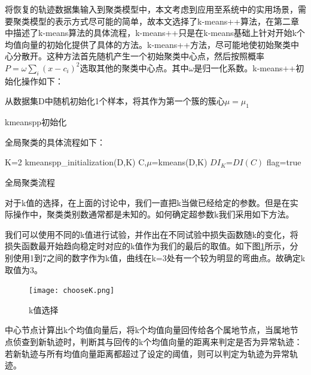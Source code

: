 将恢复的轨迹数据集输入到聚类模型中，本文考虑到应用至系统中的实用场景，需要聚类模型的表示方式尽可能的简单，故本文选择了k-means++算法，在第二章中描述了k-means算法的具体流程，k-means++只是在k-means基础上针对开始k个均值向量的初始化提供了具体的方法。k-means++方法，尽可能地使初始聚类中心分散开。这种方法首先随机产生一个初始聚类中心点，然后按照概率$P=\omega \sum_i{\left( x-c_i \right) ^2}$选取其他的聚类中心点。其中$\omega$是归一化系数。k-means++初始化操作如下：\\
\begin{algorithm}[H]
	 从数据集D中随机初始化1个样本，将其作为第一个簇的簇心$\mu={\mu_1}$\;
	 \caption{kmeanspp初始化}
\end{algorithm}

全局聚类的具体流程如下：

\begin{algorithm}[H]
	 K=2\;
	 kmeanspp\_initialization(D,K)\;
	 C,$\mu$=kmeans(D,K)\;
	 $DI_K$=$DI(C)$\;
	 flag=true\;
	 \caption{全局聚类流程}
	\label{kmeanspp}
\end{algorithm}

对于k值的选择，在上面的讨论中，我们一直把k当做已经给定的参数。但是在实际操作中，聚类类别数通常都是未知的。如何确定超参数k我们采用如下方法。

我们可以使用不同的k值进行试验，并作出在不同试验中损失函数随k的变化，将损失函数最开始趋向稳定时对应的k值作为我们的最后的取值。如下图\ref{chooseK}所示，分别使用1到7之间的数字作为k值，曲线在k=3处有一个较为明显的弯曲点。故确定k取值为3。
\begin{figure}[H]
	\texttt{[image: chooseK.png]}
	\caption{k值选择}
	\label{chooseK}
\end{figure}

中心节点计算出k个均值向量后，将k个均值向量回传给各个属地节点，当属地节点侦查到新轨迹时，判断其与回传的k个均值向量的距离来判定是否为异常轨迹：若新轨迹与所有均值向量距离都超过了设定的阈值，则可以判定为轨迹为异常轨迹。


